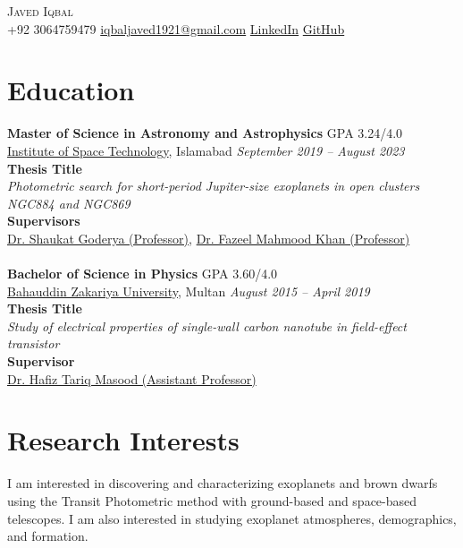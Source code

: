 \documentclass{article}
\begin{document}
\small
\vspace*{-44pt}

\begin{center}
    {\LARGE\scshape Javed Iqbal}\\
    \vspace{3pt}
    \faPhone{} +92 3064759479 \quad \faEnvelope{} \href{mailto:iqbaljaved1921@gmail.com}{iqbaljaved1921@gmail.com} \quad \faLinkedin{} \href{https://www.linkedin.com/in/jiqbal1921}{LinkedIn} \quad \faGithub{} \href{https://github.com/Jiqbal1921}{GitHub}
\end{center}

\section*{Education}
\vspace{-\baselineskip}
\noindent\makebox[\linewidth]{\rule{\textwidth}{0.4pt}}
\textbf{Master of Science in Astronomy and Astrophysics} \hfill{GPA 3.24/4.0} \\
\href{https://www.ist.edu.pk/}{Institute of Space Technology}, Islamabad \hfill \textit{September 2019 -- August 2023}\\
\textbf{Thesis Title}\\
\textit{Photometric search for short-period Jupiter-size exoplanets in open clusters NGC884 and NGC869} \\
\textbf{Supervisors}\\
\href{https://faculty.tarleton.edu/goderya/}{Dr. Shaukat Goderya (Professor)}, 
\href{https://www.ist.edu.pk/fazeel-mahmood-khan}{Dr. Fazeel Mahmood Khan (Professor)} 
\\ \\
\textbf{Bachelor of Science in Physics} \hfill{GPA 3.60/4.0} \\
\href{https://bzu.edu.pk/}{Bahauddin Zakariya University}, Multan \hfill \textit{August 2015 -- April 2019}\\
\textbf{Thesis Title}\\
\textit{Study of electrical properties of single-wall carbon nanotube in field-effect transistor}\\
\textbf{Supervisor}\\
\href{https://www.uosahiwal.edu.pk/depart-hod/physics}{Dr. Hafiz Tariq Masood (Assistant Professor)}

\section*{Research Interests}
\vspace{-\baselineskip}
\noindent\makebox[\linewidth]{\rule{\textwidth}{0.4pt}}
I am interested in discovering and characterizing exoplanets and brown dwarfs using the Transit Photometric method with ground-based and space-based telescopes. I am also interested in studying exoplanet atmospheres, demographics, and formation.
\end{document}
